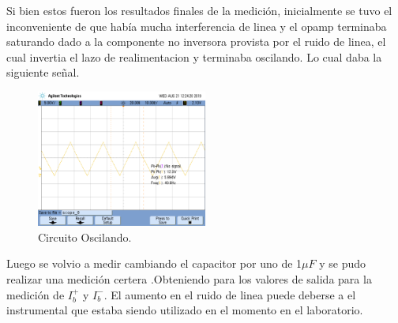 \documentclass[a4paper]{article}
\begin{document}
Si bien estos fueron los resultados finales de la medición, inicialmente se tuvo el inconveniente de que había mucha interferencia de linea y el opamp terminaba saturando dado a la componente no inversora provista por el ruido de linea, el cual invertia el lazo de realimentacion y terminaba oscilando.
Lo cual daba la siguiente señal.
\begin{figure}[H]	
	\centering
	\includegraphics[width=0.5\textwidth]{imagenes/opmpOscilando.png}
	\caption{Circuito Oscilando.}
	\label{fig:oscilando}
\end{figure}
Luego se volvio a medir cambiando el capacitor por uno de 1$\mu F$ y  se pudo realizar una medición certera .Obteniendo para los valores de salida para la medición de $I_b^+$ y $I_b^-$. El aumento en el ruido de linea puede deberse a el instrumental que estaba siendo utilizado en el momento en el laboratorio.
\end{document}
